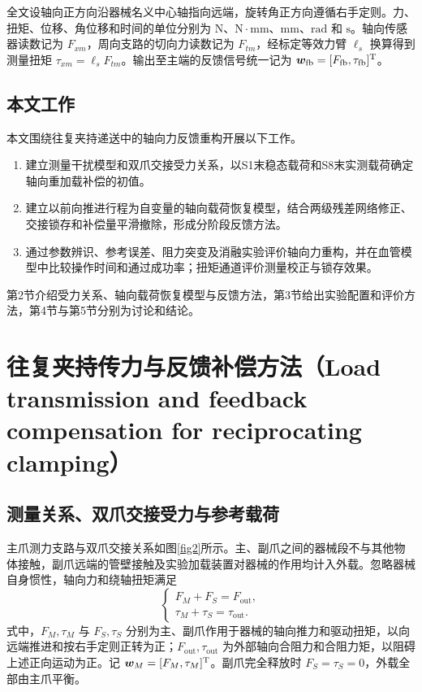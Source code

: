 \documentclass{JQR_LaTeX_Template-0507/JQRnew}
\providecommand{\RevisionColor}{\color{black}}
\newcommand{\revbegin}{\begingroup\RevisionColor}
\newcommand{\revend}{\par\endgroup}
\begin{document}
\revbegin
全文设轴向正方向沿器械名义中心轴指向远端，旋转角正方向遵循右手定则。力、扭矩、位移、角位移和时间的单位分别为 $\mathrm{N}$、$\mathrm{N}\cdot\mathrm{mm}$、$\mathrm{mm}$、$\mathrm{rad}$ 和 $\mathrm{s}$。轴向传感器读数记为 $F_{xm}$，周向支路的切向力读数记为 $F_{tm}$，经标定等效力臂 $\ell_s$ 换算得到测量扭矩 $\tau_{xm}=\ell_sF_{tm}$。输出至主端的反馈信号统一记为 $\bm w_{\mathrm{fb}}=[F_{\mathrm{fb}},\tau_{\mathrm{fb}}]^{\rm T}$。
\revend

\subsection{本文工作}

本文围绕往复夹持递送中的轴向力反馈重构开展以下工作。
\begin{enumerate}[label=\arabic*),nosep,itemsep=0pt,topsep=2pt,partopsep=0pt,parsep=0pt,leftmargin=2\ccwd]
\item 建立测量干扰模型和双爪交接受力关系，以S1末稳态载荷和S8末实测载荷确定轴向重加载补偿的初值。
\item 建立以前向推进行程为自变量的轴向载荷恢复模型，结合两级残差网络修正、交接锁存和补偿量平滑撤除，形成分阶段反馈方法。
\item 通过参数辨识、参考误差、阻力突变及消融实验评价轴向力重构，并在血管模型中比较操作时间和通过成功率；扭矩通道评价测量校正与锁存效果。
\end{enumerate}

\revbegin
第2节介绍受力关系、轴向载荷恢复模型与反馈方法，第3节给出实验配置和评价方法，第4节与第5节分别为讨论和结论。
\revend

\section{往复夹持传力与反馈补偿方法（Load transmission and feedback compensation for reciprocating clamping）}

\subsection{测量关系、双爪交接受力与参考载荷}

主爪测力支路与双爪交接关系如图\ref{fig2}所示。主、副爪之间的器械段不与其他物体接触，副爪远端的管壁接触及实验加载装置对器械的作用均计入外载。忽略器械自身惯性，轴向力和绕轴扭矩满足
\begin{equation}
\label{eq:balance}
\begin{cases}
F_M+F_S=F_{\mathrm{out}},\\
\tau_M+\tau_S=\tau_{\mathrm{out}}.
\end{cases}
\end{equation}
式中，$F_M,\tau_M$ 与 $F_S,\tau_S$ 分别为主、副爪作用于器械的轴向推力和驱动扭矩，以向远端推进和按右手定则正转为正；$F_{\mathrm{out}},\tau_{\mathrm{out}}$ 为外部轴向合阻力和合阻力矩，以阻碍上述正向运动为正。记 $\bm w_M=[F_M,\tau_M]^{\rm T}$。副爪完全释放时 $F_S=\tau_S=0$，外载全部由主爪平衡。
\end{document}
